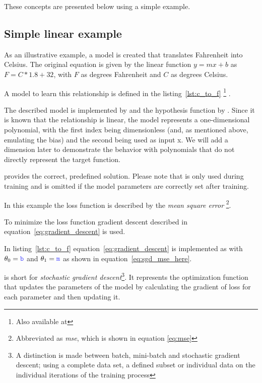 These concepts are presented below using a simple example.

\subsection{Simple linear example} \label{ch:simple_linear_example}

As an illustrative example, a model is created that translates Fahrenheit into Celsius.
The original equation is given by the linear function $y = mx + b$ as $F = C * 1.8 + 32$, with $F$ as degrees Fahrenheit and $C$ as degrees Celsius.

A model to learn this relationship is defined in the listing~\ref{lst:c_to_f} \footnote{Also available at } .



The described model is implemented by  and the hypothesis function by .
Since it is known that the relationship is linear, the model represents a one-dimensional polynomial, with the first index being dimensionless (and, as mentioned above, emulating the bias) and the second being used as input x.
We will add a dimension later to demonstrate the behavior with polynomials that do not directly represent the target function.

 provides the correct, predefined solution.
Please note that  is only used during training and is omitted if the model parameters are correctly set after training.

In this example the loss function is described by the \textit{mean square error } \footnote{ Abbreviated as \textit{mse}, which is shown in equation \eqref{eq:mse}}.

To minimize the loss function gradient descent described in equation~\eqref{eq:gradient_descent} is used.

In listing~\ref{lst:c_to_f} equation~\eqref{eq:gradient_descent} is implemented as  with $\theta_0 = \code{b}$ and $\theta_1= \code{m}$ as shown in equation~\eqref{eq:sgd_mse_here}.

 is short for \textit{stochastic gradient descent}\footnote{A distinction is made between batch, mini-batch and stochastic gradient descent; using a complete data set, a defined subset or individual data on the individual iterations of the training process}.
It represents the optimization function that updates the parameters of the model by calculating the gradient of loss for each parameter and then updating it.

